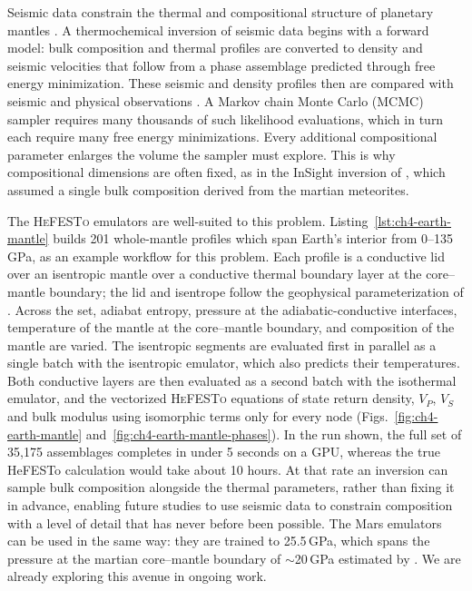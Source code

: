 Seismic data constrain the thermal and compositional structure of planetary mantles \citep{stixrude2012,jackson2021,khan2018,wood1996}. 
A thermochemical inversion of seismic data begins with a forward model: bulk composition and thermal profiles are converted to 
density and seismic velocities that follow from a phase assemblage predicted through free energy minimization. These seismic and density profiles 
then are compared with seismic and physical observations \citep{khan2008,khan2021}. A Markov chain Monte Carlo (MCMC) sampler 
requires many thousands of such likelihood evaluations, which in turn each require many free energy minimizations. Every additional
compositional parameter enlarges the volume the sampler must explore. This is why compositional dimensions are often fixed, as
in the InSight inversion of \citet{khan2021}, which assumed a single bulk composition derived from the martian meteorites.

The \textsc{HeFESTo} emulators are well-suited to this problem. Listing~\ref{lst:ch4-earth-mantle} builds 201 whole-mantle profiles
which span Earth's interior from 0--135\,GPa, as an example workflow for this problem. Each profile is a conductive lid over an isentropic mantle over a conductive
thermal boundary layer at the core--mantle boundary; the lid and isentrope follow the geophysical parameterization of
\citet{khan2021}. Across the set, adiabat entropy, pressure at the adiabatic-conductive interfaces, temperature of the mantle at the core--mantle boundary, 
and composition of the mantle are varied. The isentropic segments are evaluated first in parallel as a single batch with the isentropic emulator, which also predicts their temperatures. 
Both conductive layers are then evaluated as a second batch with the isothermal emulator, and the vectorized \textsc{HeFESTo} equations of state
return density, $V_P$, $V_S$ and bulk modulus using isomorphic terms only for every node (Figs.~\ref{fig:ch4-earth-mantle} and~\ref{fig:ch4-earth-mantle-phases}). 
In the run shown, the full set of 35{,}175 assemblages completes in under 5 seconds on a GPU, whereas the true HeFESTo calculation would take about 10 hours. At that rate an inversion can sample 
bulk composition alongside the thermal parameters, rather than fixing it in advance, enabling future studies to use seismic data to constrain composition with a level of detail
that has never before been possible. The Mars emulators can be used in the same way: they are trained to 25.5\,GPa, which spans the pressure at the martian core--mantle
boundary of $\sim$20\,GPa estimated by \citet{khan2008}. We are already exploring this avenue in ongoing work.

